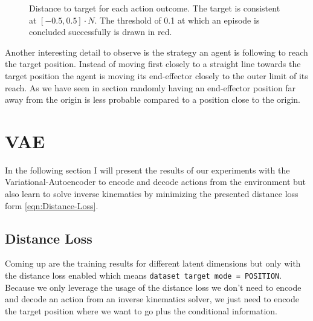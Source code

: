 \begin{figure}
\begin{center}
{            \label{fig:SAC_baseline_inference/distance_15}
            }
    \end{center}
    \caption[SAC baseline inference]{Distance to target for each action outcome. The target is consistent at $[-0.5, 0.5] \cdot N$. The threshold of 0.1 at which an episode is concluded successfully is drawn in red.} 
    \label{fig:SAC_baseline_inference_distance}
\end{figure}
Another interesting detail to observe is the strategy an agent is following to reach the target position. Instead of moving first closely to a straight line towards the target position the agent is moving its end-effector closely to the outer limit of its reach. As we have seen in section  randomly having an end-effector position far away from the origin is less probable compared to a position close to the origin. 

\section{VAE}

In the following section I will present the results of our experiments with the Variational-Autoencoder to encode and decode actions from the environment but also learn to solve inverse kinematics by minimizing the presented distance loss form \eqref{eqn:Distance-Loss}. 

\subsection{Distance Loss}

Coming up are the training results for different latent dimensions but only with the distance loss enabled which means \texttt{dataset target mode = POSITION}.\\ 
Because we only leverage the usage of the distance loss we don't need to encode and decode an action from an inverse kinematics solver, we just need to encode the target position where we want to go plus the conditional information.


